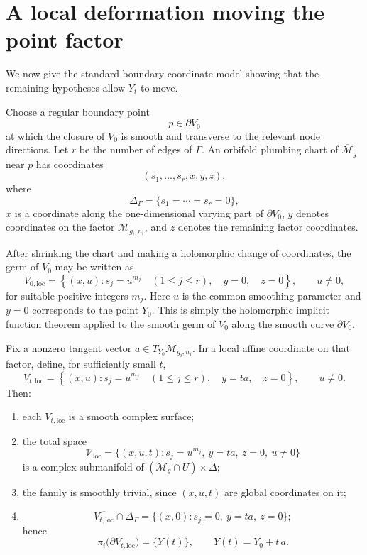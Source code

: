 \documentclass[11pt]{article}
\newcommand{\M}{\mathcal M}
\newcommand{\D}{\Delta}
\newcommand{\barM}{\overline{\M}}
\begin{document}
\section{A local deformation moving the point factor}

We now give the standard boundary-coordinate model showing that the remaining
hypotheses allow \(Y_t\) to move.

Choose a regular boundary point
\[
p\in \partial V_0
\]
at which the closure of \(V_0\) is smooth and transverse to the relevant node
directions.  Let \(r\) be the number of edges of \(\Gamma\).  An orbifold
plumbing chart of \(\barM_g\) near \(p\) has coordinates
\[
(s_1,\ldots,s_r,x,y,z),
\]
where
\[
\Delta_\Gamma=\{s_1=\cdots=s_r=0\},
\]
\(x\) is a coordinate along the one-dimensional varying part of
\(\partial V_0\), \(y\) denotes coordinates on the factor
\(\M_{g_i,n_i}\), and \(z\) denotes the remaining factor coordinates.

After shrinking the chart and making a holomorphic change of coordinates, the
germ of \(V_0\) may be written as
\[
V_{0,\mathrm{loc}}
=
\left\{
(x,u):
s_j=u^{m_j}\quad(1\leq j\leq r),\quad
y=0,\quad z=0
\right\},
\qquad u\neq 0,
\]
for suitable positive integers \(m_j\).  Here \(u\) is the common smoothing
parameter and \(y=0\) corresponds to the point \(Y_0\).  This is simply the
holomorphic implicit function theorem applied to the smooth germ of
\(\overline V_0\) along the smooth curve \(\partial V_0\).

Fix a nonzero tangent vector \(a\in T_{Y_0}\M_{g_i,n_i}\).  In a local affine
coordinate on that factor, define, for sufficiently small \(t\),
\[
V_{t,\mathrm{loc}}
=
\left\{
(x,u):
s_j=u^{m_j}\quad(1\leq j\leq r),\quad
y=t a,\quad z=0
\right\},
\qquad u\neq 0.
\]
Then:

\begin{enumerate}
\item each \(V_{t,\mathrm{loc}}\) is a smooth complex surface;
\item the total space
\[
\mathcal V_{\mathrm{loc}}
=
\{(x,u,t):s_j=u^{m_j},\ y=ta,\ z=0,\ u\neq 0\}
\]
is a complex submanifold of \((\M_g\cap U)\times \D\);
\item the family is smoothly trivial, since \((x,u,t)\) are global coordinates
on it;
\item
\[
\overline{V_{t,\mathrm{loc}}}\cap \Delta_\Gamma
=
\{(x,0):s_j=0,\ y=ta,\ z=0\};
\]
hence
\[
\pi_i\bigl(\partial V_{t,\mathrm{loc}}\bigr)=\{Y(t)\},
\qquad
Y(t)=Y_0+t\,a.
\]
\end{enumerate}
\end{document}
